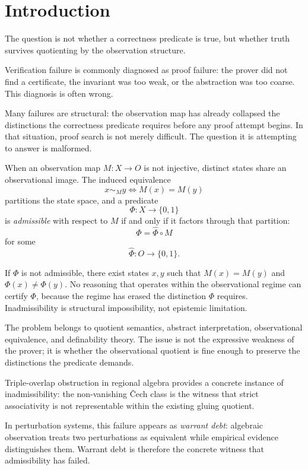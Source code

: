 \documentclass[12pt]{article}
\theoremstyle{plain}
\theoremstyle{definition}
\theoremstyle{remark}
\begin{document}
\tableofcontents
\newpage

\section{Introduction}
\label{sec:intro}

The question is not whether a correctness predicate is true,
but whether truth survives quotienting by the observation structure.

Verification failure is commonly diagnosed as proof failure: the prover
did not find a certificate, the invariant was too weak, or the
abstraction was too coarse.
This diagnosis is often wrong.

Many failures are structural: the observation map has already collapsed
the distinctions the correctness predicate requires before any proof
attempt begins.
In that situation, proof search is not merely difficult.
The question it is attempting to answer is malformed.

When an observation map $M : X \to O$ is not injective, distinct states
share an observational image.
The induced equivalence
\[
x \sim_M y \iff M(x) = M(y)
\]
partitions the state space, and a predicate
\[
\Phi : X \to \{0,1\}
\]
is \emph{admissible} with respect to $M$ if and only if it factors
through that partition:
\[
\Phi = \hat{\Phi} \circ M
\]
for some
\[
\hat{\Phi} : O \to \{0,1\}.
\]

If $\Phi$ is not admissible, there exist states $x, y$ such that
$M(x) = M(y)$ and $\Phi(x) \neq \Phi(y)$.
No reasoning that operates within the observational regime can certify
$\Phi$, because the regime has erased the distinction $\Phi$ requires.
Inadmissibility is structural impossibility, not epistemic limitation.

The problem belongs to quotient semantics, abstract interpretation,
observational equivalence, and definability theory.
The issue is not the expressive weakness of the prover; it is whether
the observational quotient is fine enough to preserve the distinctions
the predicate demands.

Triple-overlap obstruction in regional algebra provides a concrete instance of inadmissibility: the non-vanishing Čech class is the witness that strict associativity is not representable within the existing gluing quotient.

In perturbation systems, this failure appears as
\emph{warrant debt}: algebraic observation treats two perturbations as
equivalent while empirical evidence distinguishes them.
Warrant debt is therefore the concrete witness that admissibility has
failed.
\end{document}
